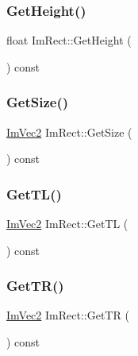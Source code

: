 \mbox{\label{struct_im_rect_a748d8ae9cb26508951ec6e2f2df0625b}} 
\subsubsection{\texorpdfstring{Get\+Height()}{GetHeight()}}
{\footnotesize\ttfamily float Im\+Rect\+::\+Get\+Height (\begin{DoxyParamCaption}{ }\end{DoxyParamCaption}) const\hspace{0.3cm}{\ttfamily [inline]}}

\mbox{\label{struct_im_rect_ae459d9c50003058cfb34519a571aaf33}} 
\subsubsection{\texorpdfstring{Get\+Size()}{GetSize()}}
{\footnotesize\ttfamily \mbox{\hyperlink{struct_im_vec2}{Im\+Vec2}} Im\+Rect\+::\+Get\+Size (\begin{DoxyParamCaption}{ }\end{DoxyParamCaption}) const\hspace{0.3cm}{\ttfamily [inline]}}

\mbox{\label{struct_im_rect_a1d4d972329722b51dca4499cb5931b4b}} 
\subsubsection{\texorpdfstring{Get\+T\+L()}{GetTL()}}
{\footnotesize\ttfamily \mbox{\hyperlink{struct_im_vec2}{Im\+Vec2}} Im\+Rect\+::\+Get\+TL (\begin{DoxyParamCaption}{ }\end{DoxyParamCaption}) const\hspace{0.3cm}{\ttfamily [inline]}}

\mbox{\label{struct_im_rect_acae90248a96be4acf1524071fca1c3f3}} 
\subsubsection{\texorpdfstring{Get\+T\+R()}{GetTR()}}
{\footnotesize\ttfamily \mbox{\hyperlink{struct_im_vec2}{Im\+Vec2}} Im\+Rect\+::\+Get\+TR (\begin{DoxyParamCaption}{ }\end{DoxyParamCaption}) const\hspace{0.3cm}{\ttfamily [inline]}}

